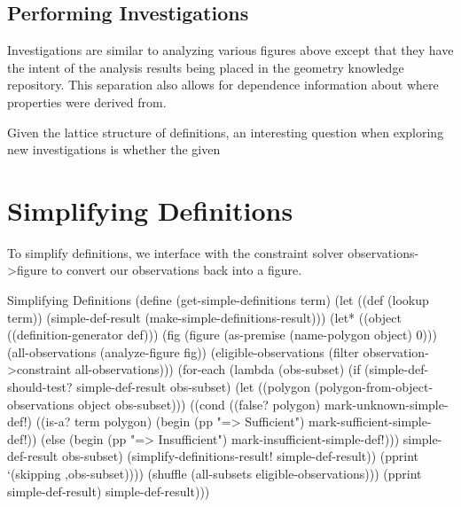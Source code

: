 \subsection{Performing Investigations}

Investigations are similar to analyzing various figures above except
that they have the intent of the analysis results being placed in the
geometry knowledge repository. This separation also allows for
dependence information about where properties were derived from.

Given the lattice structure of definitions, an interesting question
when exploring new investigations is whether the given

\section{Simplifying Definitions}

To simplify definitions, we interface with the constraint solver
observations->figure to convert our observations back into a figure.

\begin{code-listing}{Simplifying Definitions}
(define (get-simple-definitions term)
  (let ((def (lookup term))
        (simple-def-result (make-simple-definitions-result)))
    (let* ((object ((definition-generator def)))
           (fig (figure (as-premise (name-polygon object) 0)))
           (all-observations (analyze-figure fig))
           (eligible-observations
            (filter observation->constraint all-observations)))
      (for-each
       (lambda (obs-subset)
         (if (simple-def-should-test? simple-def-result obs-subset)
             (let ((polygon
                    (polygon-from-object-observations object obs-subset)))
               ((cond ((false? polygon) mark-unknown-simple-def!)
                      ((is-a? term polygon)
                       (begin (pp "=> Sufficient")
                              mark-sufficient-simple-def!))
                      (else (begin (pp "=> Insufficient")
                                   mark-insufficient-simple-def!)))
                simple-def-result obs-subset)
               (simplify-definitions-result! simple-def-result))
             (pprint `(skipping ,obs-subset))))
       (shuffle (all-subsets eligible-observations)))
      (pprint simple-def-result)
      simple-def-result)))
\end{code-listing}

